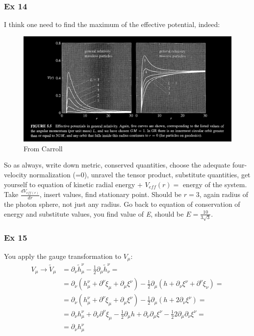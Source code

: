 \subsubsection{Ex 14}
I think one need to find the maximum of the effective potential, indeed:
\begin{figure}[h]
\centering
\includegraphics[width=\linewidth]{imm/ex14.png}
\caption{From Carroll}
\label{imm:ex14.png}
\end{figure}

So as always, write down metric, conserved quantities, choose the adequate four-velocity normalization (=0), unravel the tensor product, substitute quantities, get yourself to equation of kinetic radial energy + $V_{eff}\left( r \right) = $ energy of the system. Take $ \frac{d V_{eff\left( r \right)}}{d r}$,  insert values, find stationary point. Should be $r = 3$, again radius of the photon sphere, not just any radius. Go back to equation of conservation of energy and substitute values, you find value of \emph{E}, should be $E = \frac{10}{3\sqrt{3}}$.

\subsubsection{Ex 15}

You apply the gauge transformation to $V_{\mu }$:
\begin{align*}
	V_{\mu } \to  \tilde{V}_{\mu } &= \partial_{\nu }\tilde{h}^{\nu }_{\mu } - \frac{1}{2}\partial_{\mu }\tilde{h}^{\nu }_{\nu } =\\
				       &= \partial_{\nu }\left( h^{\nu }_{\mu } + \partial^{\nu }\xi _{\mu } + \partial_{\mu }\xi ^{\nu } \right) - \frac{1}{2}\partial_{\mu }\left( h + \partial_{\nu }\xi ^{\nu }+\partial^{\nu }\xi _{\nu } \right) = \\
				       &= \partial_{\nu }\left( h^{\nu }_{\mu } + \partial^{\nu }\xi _{\mu } + \partial_{\mu }\xi ^{\nu } \right) - \frac{1}{2}\partial_{\mu }\left( h + 2\partial_{\nu }\xi ^{\nu } \right) = \\
				       &= \partial_{\nu }h^{\nu }_{\mu } + \partial_{\nu }\partial^{\nu }\xi _{\mu } - \frac{1}{2} \partial_{\mu }h + \partial_{\nu }\partial_{\mu }\xi ^{\nu }- \frac{1}{2}2 \partial_{\mu }\partial_{\nu }\xi ^{\nu } = \\
				       &= \partial_{\nu }h^{\nu}_{\mu }
\end{align*}

